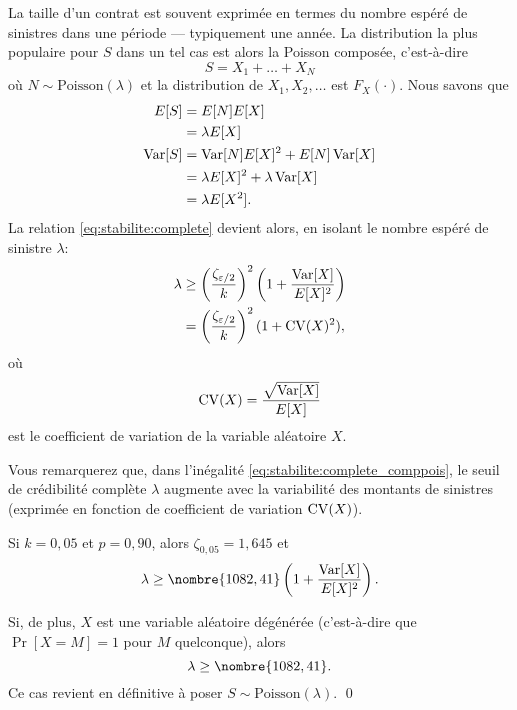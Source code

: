 \begin{exemple}
  \label{exemple:stabilite:comppois}
  La taille d'un contrat est souvent exprimée en termes du nombre
  espéré de sinistres dans une période --- typiquement une année. La
  distribution la plus populaire pour $S$ dans un tel cas est alors la
  Poisson composée, c'est-à-dire
  \begin{displaymath}
    S = X_1 + \dots + X_N
  \end{displaymath}
  où $N \sim \text{Poisson}(\lambda)$ et la distribution de $X_1, X_2,
  \dots$ est $F_X(\cdot)$. Nous savons que
  \begin{align*}
    E [ S ]
    &= E [ N ] E [ X ] \\
    &= \lambda E [ X ] \\
    \operatorname{Var} [ S ]
    &= \operatorname{Var} [ N ] E [ X ]^2 + E [ N ] \operatorname{Var} [ X ] \\
    &= \lambda E [ X ]^2 + \lambda \operatorname{Var} [ X ] \\
    &= \lambda E [ X^2 ].
  \end{align*}
  La relation \eqref{eq:stabilite:complete} devient alors, en isolant
  le nombre espéré de sinistre $\lambda$:
  \begin{equation}
    \label{eq:stabilite:complete_comppois}
    \begin{split}
      \lambda
      &\geq
      \left(
        \frac{\zeta_{\varepsilon/2}}{k}
      \right)^2
      \left(
        1 + \frac{\operatorname{Var} [ X ]}{E [ X ]^2}
      \right) \\
      &=
      \left(
        \frac{\zeta_{\varepsilon/2}}{k}
      \right)^2
      (1 + \operatorname{CV}(X)^2),
    \end{split}
  \end{equation}
  où
  \begin{displaymath}
    \operatorname{CV}(X) = \frac{\sqrt{\operatorname{Var} [ X ]}}{E [ X ]}
  \end{displaymath}
  est le coefficient de variation de la variable aléatoire $X$.

  Vous remarquerez que, dans l'inégalité
  \eqref{eq:stabilite:complete_comppois}, le seuil de crédibilité
  complète $\lambda$ augmente avec la variabilité des montants de
  sinistres (exprimée en fonction de coefficient de variation
  $\operatorname{CV}(X)$).

  Si $k = 0,05$ et $p = 0,90$, alors $\zeta_{0,05} = 1,645$ et
  \begin{displaymath}
    \lambda
    \geq
    \nombre{1082,41}
    \left(
      1 + \frac{\var{X}}{\esp{X}^2}
    \right).
  \end{displaymath}

  Si, de plus, $X$ est une variable aléatoire dégénérée (c'est-à-dire
  que $\Pr[X = M] = 1$ pour $M$ quelconque), alors
  \begin{displaymath}
    \lambda \geq \nombre{1082,41}.
  \end{displaymath}
  Ce cas revient en définitive à poser
  $S \sim \text{Poisson}(\lambda)$. %
  \qed
\end{exemple}

